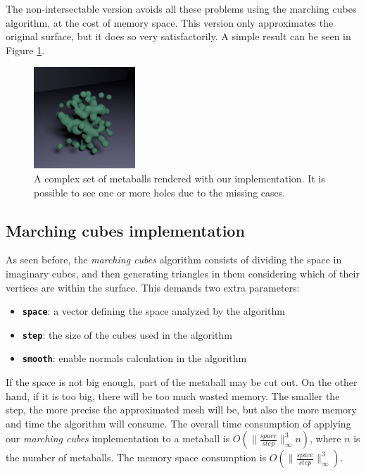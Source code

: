 \documentclass[conference]{acmsiggraph}
\begin{document}
The non-intersectable version avoids all these problems using the marching cubes
algorithm, at the cost of memory space. This version only approximates the original
surface, but it does so very satisfactorily. A simple result can be seen in Figure
\ref{img:marching-cubes}.

\begin{figure}[ht]
  \centering
  \includegraphics[width=1.5in]{images/blob.png}
  \caption{A complex set of metaballs rendered with our implementation. It is
           possible to see one or more holes due to the missing cases.}
  \label{img:marching-cubes}
\end{figure}

\subsection{Marching cubes implementation}

As seen before, the \textit{marching cubes} algorithm consists of dividing the
space in imaginary cubes, and then generating triangles in them considering
which of their vertices are within the surface. This demands two extra
parameters:

\begin{itemize}
  \item \textbf{\texttt{space}}: a vector defining the space analyzed by the algorithm
  \item \textbf{\texttt{step}}: the size of the cubes used in the algorithm
  \item \textbf{\texttt{smooth}}: enable normals calculation in the algorithm
\end{itemize}

If the space is not big enough, part of the metaball may be cut out. On the
other hand, if it is too big, there will be too much wasted memory. The smaller
the step, the more precise the approximated mesh will be, but also the more
memory and time the algorithm will consume. The overall time consumption of
applying our \textit{marching cubes} implementation to a metaball is
$O(\|\frac{space}{step}\|_\infty^3 n)$, where $n$ is the number of metaballs.
The memory space consumption is $O(\|\frac{space}{step}\|_\infty^3)$.
\end{document}
